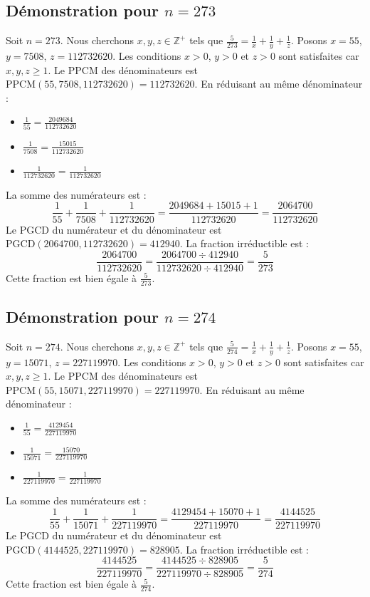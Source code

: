 \documentclass[11pt,a4paper]{article}
\begin{document}
\subsection{Démonstration pour $n = 273$}
Soit $n = 273$. Nous cherchons $x, y, z \in \mathbb{Z}^{+}$ tels que $\frac{5}{273} = \frac{1}{x} + \frac{1}{y} + \frac{1}{z}$.
Posons $x = 55$, $y = 7508$, $z = 112732620$.
Les conditions $x > 0$, $y > 0$ et $z > 0$ sont satisfaites car $x, y, z \geq 1$.
Le PPCM des dénominateurs est $\text{PPCM}(55, 7508, 112732620) = 112732620$.
En réduisant au même dénominateur :
\begin{itemize}
    \item $\frac{1}{55} = \frac{2049684}{112732620}$
    \item $\frac{1}{7508} = \frac{15015}{112732620}$
    \item $\frac{1}{112732620} = \frac{1}{112732620}$
\end{itemize}
La somme des numérateurs est :
$$ \frac{1}{55} + \frac{1}{7508} + \frac{1}{112732620} = \frac{2049684 + 15015 + 1}{112732620} = \frac{2064700}{112732620} $$
Le PGCD du numérateur et du dénominateur est $\text{PGCD}(2064700, 112732620) = 412940$.
La fraction irréductible est :
$$ \frac{2064700}{112732620} = \frac{2064700 \div 412940}{112732620 \div 412940} = \frac{5}{273} $$
Cette fraction est bien égale à $\frac{5}{273}$.

\subsection{Démonstration pour $n = 274$}
Soit $n = 274$. Nous cherchons $x, y, z \in \mathbb{Z}^{+}$ tels que $\frac{5}{274} = \frac{1}{x} + \frac{1}{y} + \frac{1}{z}$.
Posons $x = 55$, $y = 15071$, $z = 227119970$.
Les conditions $x > 0$, $y > 0$ et $z > 0$ sont satisfaites car $x, y, z \geq 1$.
Le PPCM des dénominateurs est $\text{PPCM}(55, 15071, 227119970) = 227119970$.
En réduisant au même dénominateur :
\begin{itemize}
    \item $\frac{1}{55} = \frac{4129454}{227119970}$
    \item $\frac{1}{15071} = \frac{15070}{227119970}$
    \item $\frac{1}{227119970} = \frac{1}{227119970}$
\end{itemize}
La somme des numérateurs est :
$$ \frac{1}{55} + \frac{1}{15071} + \frac{1}{227119970} = \frac{4129454 + 15070 + 1}{227119970} = \frac{4144525}{227119970} $$
Le PGCD du numérateur et du dénominateur est $\text{PGCD}(4144525, 227119970) = 828905$.
La fraction irréductible est :
$$ \frac{4144525}{227119970} = \frac{4144525 \div 828905}{227119970 \div 828905} = \frac{5}{274} $$
Cette fraction est bien égale à $\frac{5}{274}$.
\end{document}
